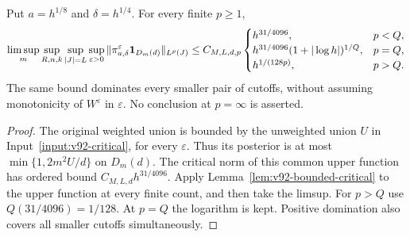 \begin{corollary}
\label{cor:v92-posterior}
Put $a=h^{1/8}$ and $\delta=h^{1/4}$. For every finite $p\ge1$,
\begin{equation}\label{eq:v92-posterior-power}
 \limsup_m\sup_{R,n,k}\sup_{|J|=L}\sup_{\varepsilon>0}
 \|\pi_{a,\delta}^\varepsilon\one_{D_m(d)}\|_{L^p(J)}
 \le C_{M,L,d,p}
 \begin{cases}
 h^{31/4096},&p<Q,\\
 h^{31/4096}(1+|\log h|)^{1/Q},&p=Q,\\
 h^{1/(128p)},&p>Q.
 \end{cases}
\end{equation}
The same bound dominates every smaller pair of cutoffs, without
assuming monotonicity of $W^\varepsilon$ in $\varepsilon$.
No conclusion at $p=\infty$ is asserted.
\end{corollary}
\begin{proof}
The original weighted union is bounded by the unweighted union $U$ in
Input~\ref{input:v92-critical}, for every $\varepsilon$. Thus its
posterior is at most $\min\{1,2m^2U/d\}$ on $D_m(d)$.
The critical norm of this common upper function has ordered bound
$C_{M,L,d}h^{31/4096}$. Apply Lemma~\ref{lem:v92-bounded-critical}
to the upper function at every finite count, and then take the limsup.
For $p>Q$ use $Q(31/4096)=1/128$. At $p=Q$ the logarithm is kept.
Positive domination also covers all smaller cutoffs simultaneously.
\end{proof}
